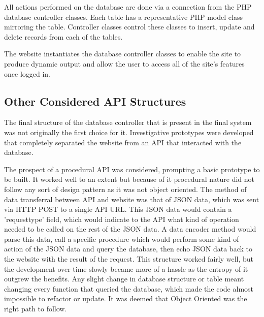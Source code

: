 		All actions performed on the database are done via a connection from the PHP database controller classes. Each table has a representative PHP model class mirroring the table. Controller classes control these classes to insert, update and delete records from each of the tables.
		
		The website instantiates the database controller classes to enable the site to produce dynamic output and allow the user to access all of the site's features once logged in.
		
	\subsection{Other Considered API Structures}
		The final structure of the database controller that is present in the final system was not originally the first choice for it. Investigative prototypes were developed that completely separated the website from an API that interacted with the database. 
		
		The prospect of a procedural API was considered, prompting a basic prototype to be built. It worked well to an extent but because of it procedural nature did not follow any sort of design pattern as it was not object oriented. The method of data transferral between API and website was that of JSON data, which was sent via HTTP POST to a single API URL. This JSON data would contain a 'request\textunderscore type' field, which would indicate to the API what kind of operation needed to be called on the rest of the JSON data. A data encoder method would parse this data, call a specific procedure which would perform some kind of action of the JSON data and query the database, then echo JSON data back to the website with the result of the request. This structure worked fairly well, but the development over time slowly became more of a hassle as the entropy of it outgrew the benefits. Any slight change in database structure or table meant changing every function that queried the database, which made the code almost impossible to refactor or update. It was deemed that Object Oriented was the right path to follow. 
		
